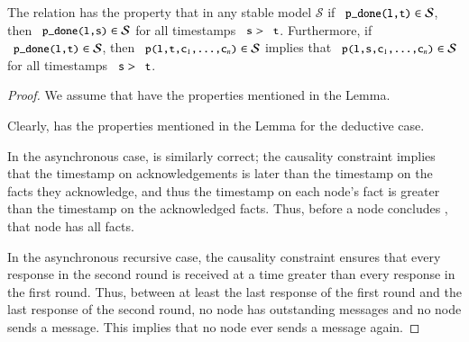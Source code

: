 \begin{lemma}[Sealing]
\label{lem:plang-done-right}
The relation  has the property that in any stable model $\mathcal{S}$ if $\dedalus{p_done(l,t)} \in \mathcal{S}$,  then $\dedalus{p_done(l,s)} \in \mathcal{S}$ for all timestamps $\dedalus{s} > \dedalus{t}$.  Furthermore, if $\dedalus{p_done(l,t)} \in \mathcal{S}$, then $\dedalus{p(l,t,c\sub{1},\ldots,c\sub{n})} \in \mathcal{S}$ implies that $\dedalus{p(l,s,c\sub{1},\ldots,c\sub{n})} \in \mathcal{S}$ for all timestamps $\dedalus{s} > \dedalus{t}$.
\end{lemma}
\begin{proof}
We assume that  have the properties mentioned in the Lemma.

Clearly,  has the properties mentioned in the Lemma for the deductive case.

In the asynchronous case,  is similarly correct; the causality constraint implies that the timestamp on acknowledgements is later than the timestamp on the facts they acknowledge, and thus the timestamp on each node's  fact is greater than the timestamp on the acknowledged facts.  Thus, before a node concludes , that node has all  facts.

In the asynchronous recursive case, the causality constraint ensures that every response in the second round is received at a time greater than every response in the first round.  Thus, between at least the last response of the first round and the last response of the second round, no node has outstanding messages and no node sends a message.  This implies that no node ever sends a message again.
\end{proof}



